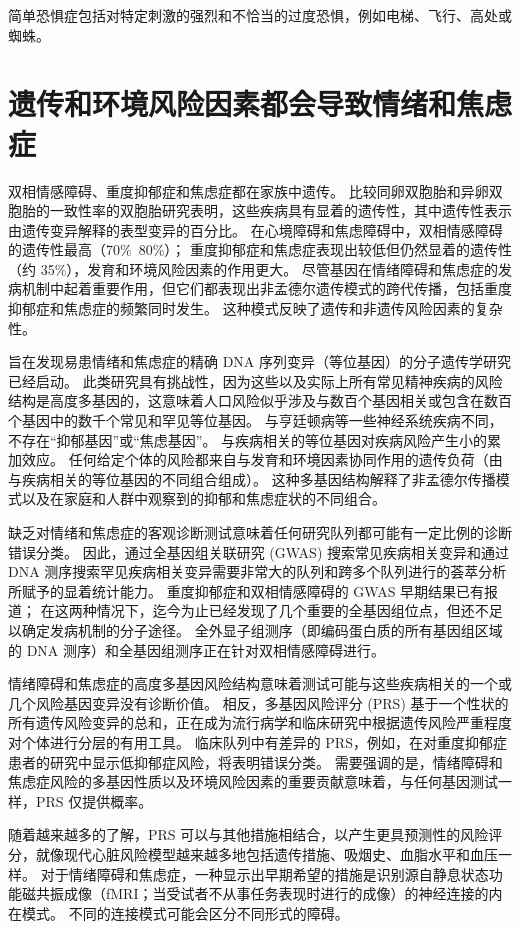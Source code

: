 简单恐惧症包括对特定刺激的强烈和不恰当的过度恐惧，例如电梯、飞行、高处或蜘蛛。

\section{遗传和环境风险因素都会导致情绪和焦虑症}
双相情感障碍、重度抑郁症和焦虑症都在家族中遗传。 比较同卵双胞胎和异卵双胞胎的一致性率的双胞胎研究表明，这些疾病具有显着的遗传性，其中遗传性表示由遗传变异解释的表型变异的百分比。 在心境障碍和焦虑障碍中，双相情感障碍的遗传性最高（70\%~80\%）； 重度抑郁症和焦虑症表现出较低但仍然显着的遗传性（约 35\%），发育和环境风险因素的作用更大。 尽管基因在情绪障碍和焦虑症的发病机制中起着重要作用，但它们都表现出非孟德尔遗传模式的跨代传播，包括重度抑郁症和焦虑症的频繁同时发生。 这种模式反映了遗传和非遗传风险因素的复杂性。

旨在发现易患情绪和焦虑症的精确 DNA 序列变异（等位基因）的分子遗传学研究已经启动。 此类研究具有挑战性，因为这些以及实际上所有常见精神疾病的风险结构是高度多基因的，这意味着人口风险似乎涉及与数百个基因相关或包含在数百个基因中的数千个常见和罕见等位基因。 与亨廷顿病等一些神经系统疾病不同，不存在“抑郁基因”或“焦虑基因”。 与疾病相关的等位基因对疾病风险产生小的累加效应。 任何给定个体的风险都来自与发育和环境因素协同作用的遗传负荷（由与疾病相关的等位基因的不同组合组成）。 这种多基因结构解释了非孟德尔传播模式以及在家庭和人群中观察到的抑郁和焦虑症状的不同组合。

缺乏对情绪和焦虑症的客观诊断测试意味着任何研究队列都可能有一定比例的诊断错误分类。 因此，通过全基因组关联研究 (GWAS) 搜索常见疾病相关变异和通过 DNA 测序搜索罕见疾病相关变异需要非常大的队列和跨多个队列进行的荟萃分析所赋予的显着统计能力。 重度抑郁症和双相情感障碍的 GWAS 早期结果已有报道； 在这两种情况下，迄今为止已经发现了几个重要的全基因组位点，但还不足以确定发病机制的分子途径。 全外显子组测序（即编码蛋白质的所有基因组区域的 DNA 测序）和全基因组测序正在针对双相情感障碍进行。

情绪障碍和焦虑症的高度多基因风险结构意味着测试可能与这些疾病相关的一个或几个风险基因变异没有诊断价值。 相反，多基因风险评分 (PRS) 基于一个性状的所有遗传风险变异的总和，正在成为流行病学和临床研究中根据遗传风险严重程度对个体进行分层的有用工具。 临床队列中有差异的 PRS，例如，在对重度抑郁症患者的研究中显示低抑郁症风险，将表明错误分类。 需要强调的是，情绪障碍和焦虑症风险的多基因性质以及环境风险因素的重要贡献意味着，与任何基因测试一样，PRS 仅提供概率。

随着越来越多的了解，PRS 可以与其他措施相结合，以产生更具预测性的风险评分，就像现代心脏风险模型越来越多地包括遗传措施、吸烟史、血脂水平和血压一样。 对于情绪障碍和焦虑症，一种显示出早期希望的措施是识别源自静息状态功能磁共振成像（fMRI；当受试者不从事任务表现时进行的成像）的神经连接的内在模式。 不同的连接模式可能会区分不同形式的障碍。

